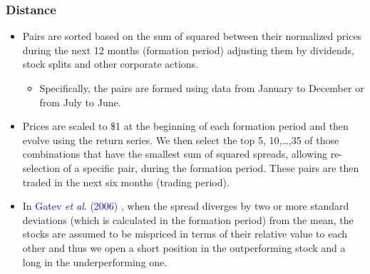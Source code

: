 \documentclass[pdf,9pt,xcolor=dvipsnames,hide notes]{beamer}
\begin{document}
\begin{frame}[label=frame2c]
\frametitle{Distance}

\begin{itemize}
\justifying
\item  Pairs are sorted based on the sum of squared between their normalized prices during the next 12 months (formation period) adjusting them by dividends, stock splits and other corporate actions. 

\begin{itemize}
	\item Specifically, the pairs are formed using data from January to December or from July to June.
\end{itemize}

\vspace{0.3cm}

\item Prices are scaled to \$1 at the beginning of each formation period and then evolve using the return series. We then select the top 5, 10,\ldots,35 of those combinations that have the smallest sum of squared spreads, allowing re-selection of a specific pair, during the formation period. These pairs are then traded in the next six months (trading period).

\vspace{0.6cm}

\item In \textcolor{blue}{Gatev \emph{et al}}. \textcolor{blue}{(2006)} , when the spread diverges by two or more standard deviations (which is calculated in the formation period) from the mean, the stocks are assumed to be mispriced in terms of their relative value to each other and thus we open a short position in the outperforming stock and a long in the underperforming one. 

\end{itemize}

\end{frame}
\end{document}
